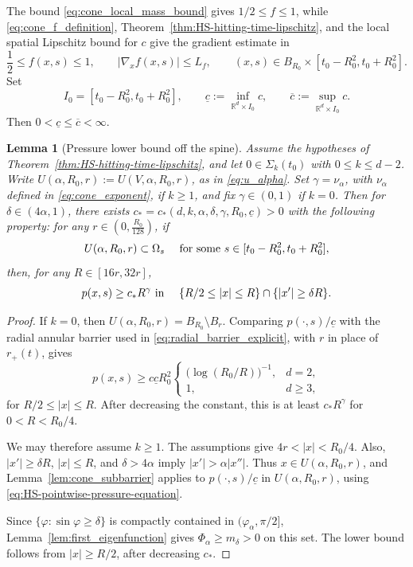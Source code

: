 \documentclass[11pt]{amsart}
\numberwithin{equation}{section}
\numberwithin{figure}{section}
\theoremstyle{plain}
\newtheorem{lem}[thm]{Lemma}
\theoremstyle{definition}
\theoremstyle{remark}
\theoremstyle{plain}
\def\R{\mathbb{R}}
\begin{document}
The bound \eqref{eq:cone_local_mass_bound} gives \(1/2\leq f\leq1\),
while \eqref{eq:cone_f_definition}, Theorem~\ref{thm:HS-hitting-time-lipschitz},
and the local spatial Lipschitz bound for \(c\) give the gradient estimate in
\begin{equation}\label{eq:cone_f_slice}
    \frac12\leq f(x,s)\leq 1,
    \qquad
    |\nabla_x f(x,s)|\leq L_f,
    \qquad
    (x,s)\in B_{R_0}\times [t_0-R_0^2,t_0+R_0^2].
\end{equation}
Set
\[
I_0= [t_0-R_0^2,t_0+R_0^2],\qquad \underline c:=\inf_{\R^d\times I_0}c,\qquad
    \overline c:=\sup_{\R^d\times I_0}c.
\]
Then \(0<\underline c\leq\overline c<\infty\).
\begin{lem}[Pressure lower bound off the spine]\label{lem:cone_pressure_away_spine}
Assume the hypotheses of Theorem~\ref{thm:HS-hitting-time-lipschitz}, and let
\(0\in\Sigma_k(t_0)\) with \(0\leq k\leq d-2\).
Write \(U(\alpha,R_0,r):=U(V,\alpha,R_0,r)\), as in \eqref{eq:u_alpha}. Set \(\gamma=\nu_\alpha\), with \(\nu_\alpha\) defined in \eqref{eq:cone_exponent}, if \(k\geq1\), and fix \(\gamma\in(0,1)\) if \(k=0\). Then for \(\delta\in(4\alpha,1)\), there exists $c_*=c_*(d,k,\alpha,\delta,\gamma,R_0, \underline c)>0$ with the following
property:  for any $r\in (0,\frac{R_0}{128})$, if 
\[
    U(\alpha,R_0,r)\subset\Omega_s \quad \hbox{ for some  }
s\in [t_0-R_0^2, t_0+R_0^2], \]
then, for any $R\in [16r, 32r]$, 
\begin{equation}\label{eq:cone_pressure_lower_away_spine}
    p(x,s)\geq c_*R^\gamma \hbox{ in } \quad \{R/2\leq |x|\leq R\}\cap \{|x'| \geq \delta R\}.
\end{equation}
\end{lem}
\begin{proof}
If \(k=0\), then \(U(\alpha,R_0,r)=B_{R_0}\setminus B_r\).  Comparing
\(p(\cdot,s)/\underline c\) with the radial annular barrier used in
\eqref{eq:radial_barrier_explicit}, with \(r\) in place of \(r_+(t)\), gives
\[
    p(x,s)\geq c\underline c R_0^2
    \begin{cases}
        \bigl(\log(R_0/R)\bigr)^{-1}, & d=2,\\
        1, & d\geq3,
    \end{cases}
\]
for \(R/2\leq |x|\leq R\).  After
decreasing the constant, this is at least \(c_*R^\gamma\) for
\(0<R<R_0/4\).

We may therefore assume \(k\geq1\). The assumptions give \(4r<|x|<R_0/4\). Also,
\(|x'|\geq\delta R\), \(|x|\leq R\), and \(\delta>4\alpha\) imply
\(|x'|>\alpha |x''|\). Thus \(x\in U(\alpha,R_0,r)\), and
Lemma~\ref{lem:cone_subbarrier} applies to \(p(\cdot,s)/\underline c\) in
\(U(\alpha,R_0,r)\), using \eqref{eq:HS-pointwise-pressure-equation}.

Since \(\{\varphi:\sin\varphi\geq\delta\}\) is compactly contained in
\((\varphi_\alpha,\pi/2]\), Lemma~\ref{lem:first_eigenfunction} gives
\(\Phi_\alpha\geq m_\delta>0\) on this set. The lower bound follows from
\(|x|\geq R/2\), after decreasing \(c_*\).
\end{proof}
\end{document}

